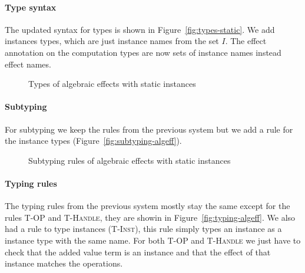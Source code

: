 {\paragraph{Type syntax}
The updated syntax for types is shown in Figure~\ref{fig:types-static}.
We add instances types, which are just instance names from the set $I$.
The effect annotation on the computation types are now sets of instance names instead effect names.

\begin{figure}
\caption{Types of algebraic effects with static instances}
\centering
{}
\end{figure}

\paragraph{Subtyping}
For subtyping we keep the rules from the previous system but we add a rule for the instance types (Figure~\ref{fig:subtyping-algeff}).

\begin{figure}
\caption{Subtyping rules of algebraic effects with static instances}
\centering
{}
\end{figure}

\paragraph{Typing rules}
The typing rules from the previous system mostly stay the same except for the rules \textsc{T-OP} and \textsc{T-Handle}, they are showin in Figure~\ref{fig:typing-algeff}.
We also had a rule to type instances (\textsc{T-Inst}), this rule simply types an instance as a instance type with the same name.
For both \textsc{T-OP} and \textsc{T-Handle} we just have to check that the added value term is an instance and that the effect of that instance matches the operations.

}
